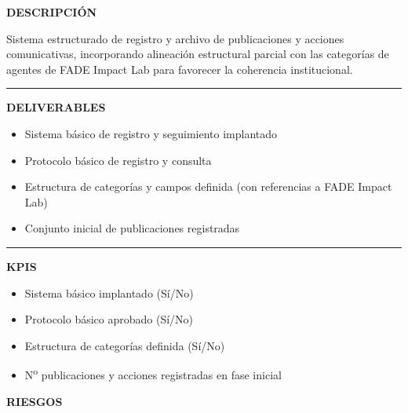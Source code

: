 \documentclass[11pt,a4paper]{scrreprt}
\newcommand{\fieldlabel}[1]{%
  {\footnotesize\sffamily\bfseries\color{mutedcolor}\MakeUppercase{#1}}\par\nopagebreak[4]
}
\newcommand{\fieldsep}{\vspace{3pt}\noindent\textcolor{bordercolor}{\rule{\linewidth}{0.4pt}}\vspace{3pt}\par}
\begin{document}
\begin{tcolorbox}[pabox={comcolor}{PA3.1 \enspace\textbullet\enspace Implantación del sistema de registro, archivo y seguimiento de publicaciones y acciones comunicativas}]

\fieldlabel{Descripci\'on}
{\small Sistema estructurado de registro y archivo de publicaciones y acciones comunicativas, incorporando alineación estructural parcial con las categorías de agentes de FADE Impact Lab para favorecer la coherencia institucional.}\par
\fieldsep
\fieldlabel{Deliverables}
{\small \begin{itemize}[noitemsep,topsep=2pt]
\item Sistema básico de registro y seguimiento implantado
\item Protocolo básico de registro y consulta
\item Estructura de categorías y campos definida (con referencias a FADE Impact Lab)
\item Conjunto inicial de publicaciones registradas
\end{itemize}}\par
\fieldsep
\fieldlabel{KPIs}
{\small \begin{itemize}[noitemsep,topsep=2pt]
\item Sistema básico implantado (Sí/No)
\item Protocolo básico aprobado (Sí/No)
\item Estructura de categorías definida (Sí/No)
\item N\textsuperscript{o} publicaciones y acciones registradas en fase inicial
\end{itemize}}\par
\end{tcolorbox}
\begin{tcolorbox}[riskbox]
{\footnotesize\sffamily\bfseries\color{red!50!black} RIESGOS}\par{}
\end{tcolorbox}
\end{document}
